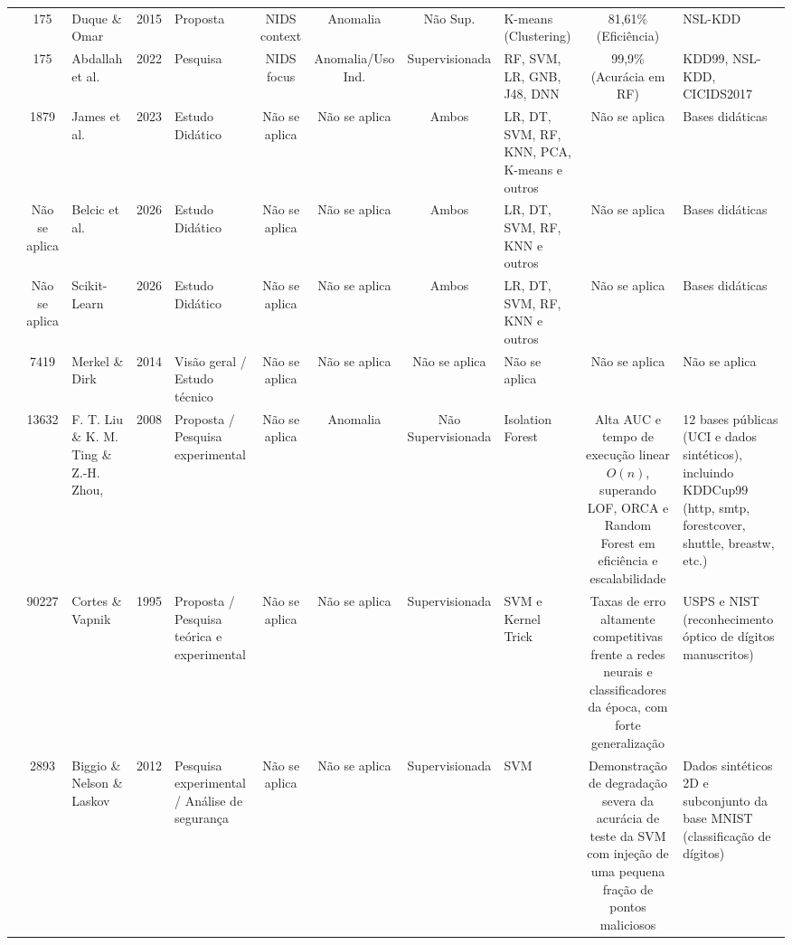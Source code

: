 \documentclass[a4paper,10pt, twocolumn]{article}
\begin{document}
\begin{table}[htbp]
\begin{adjustbox}{width=\textwidth}
\begin{tabular}{p{4cm} c p{3cm} c p{3cm} c c c p{4cm} c p{4cm}}
\cite{solane2015using} & 175 & Duque \& Omar & 2015 & Proposta & NIDS context & Anomalia & Não Sup. & K-means (Clustering) & 81,61\% (Eficiência) & NSL-KDD \\

\cite{emad2022intrusion} & 175 & Abdallah et al. & 2022 & Pesquisa & NIDS focus & Anomalia/Uso Ind. & Supervisionada & RF, SVM, LR, GNB, J48, DNN & 99,9\% (Acurácia em RF) & KDD99, NSL-KDD, CICIDS2017 \\

\cite{James2023Introduction} & 1879 & James et al. & 2023 & Estudo Didático & Não se aplica & Não se aplica & Ambos & LR, DT, SVM, RF, KNN, PCA, K-means e outros & Não se aplica & Bases didáticas \\

\cite{IBM2026Supervised} & Não se aplica & Belcic et al. & 2026 & Estudo Didático & Não se aplica & Não se aplica & Ambos & LR, DT, SVM, RF, KNN e outros & Não se aplica & Bases didáticas \\

\cite{scikit2026learn} & Não se aplica & Scikit-Learn & 2026 & Estudo Didático & Não se aplica & Não se aplica & Ambos & LR, DT, SVM, RF, KNN e outros & Não se aplica & Bases didáticas \\

\cite{Merkel2014Docker} & 7419 & Merkel \& Dirk & 2014 & Visão geral / Estudo técnico & Não se aplica & Não se aplica & Não se aplica & Não se aplica & Não se aplica & Não se aplica \\

\cite{Tony2008Isolation} & 13632 & F. T. Liu \& K. M. Ting \& Z.-H. Zhou, & 2008 & Proposta / Pesquisa experimental & Não se aplica & Anomalia & Não Supervisionada & Isolation Forest & Alta AUC e tempo de execução linear $O(n)$, superando LOF, ORCA e Random Forest em eficiência e escalabilidade & 12 bases públicas (UCI e dados sintéticos), incluindo KDDCup99 (http, smtp, forestcover, shuttle, breastw, etc.) \\

\cite{Corinna1995Support} & 90227 & Cortes \& Vapnik & 1995 & Proposta / Pesquisa teórica e experimental & Não se aplica & Não se aplica & Supervisionada & SVM e Kernel Trick & Taxas de erro altamente competitivas frente a redes neurais e classificadores da época, com forte generalização & USPS e NIST (reconhecimento óptico de dígitos manuscritos) \\

\cite{Battista2012Poisoning} & 2893 & Biggio \& Nelson \& Laskov & 2012 & Pesquisa experimental / Análise de segurança & Não se aplica & Não se aplica & Supervisionada & SVM & Demonstração de degradação severa da acurácia de teste da SVM com injeção de uma pequena fração de pontos maliciosos & Dados sintéticos 2D e subconjunto da base MNIST (classificação de dígitos) \\


\end{tabular}
\end{adjustbox}
\end{table}
\end{document}
